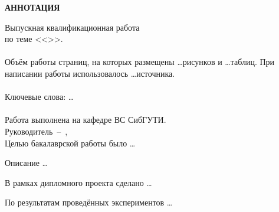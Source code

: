 \begin{center}
    \bf
    АННОТАЦИЯ
\end{center}


Выпускная квалификационная работа \fioa \\
по теме <<\topicname>>.\\
\hfill \\
Объём работы \pageref{LastPage} страниц, на которых размещены \dots рисунков
и \dots таблиц. При написании работы использовалось \dots источника. \\
\hfill \\
Ключевые слова: \dots \\
\hfill \\
Работа выполнена на кафедре ВС СибГУТИ. \\
Руководитель~--~\thead, \\


Целью бакалаврской работы было \dots


Описание \dots


В рамках дипломного проекта сделано \dots


По результатам проведённых экспериментов \dots

\thispagestyle{empty}
\newpage
